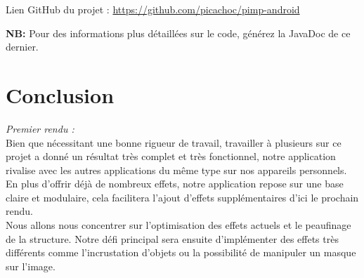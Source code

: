 \documentclass[12pt, a4paper]{article}
\begin{document}
\vspace{1cm}
\faArrowRight Lien GitHub du projet :
\href{https://github.com/picachoc/pimp-android}{https://github.com/picachoc/pimp-android}
\vspace{0.5cm}

\textbf{NB: } Pour des informations plus détaillées sur le code, générez la JavaDoc de ce dernier.

\clearpage


\clearpage


\clearpage


\clearpage


\clearpage


\clearpage


\clearpage 

\section{Conclusion}
\emph{Premier rendu :}
\\
Bien que nécessitant une bonne rigueur de travail, travailler à plusieurs sur ce projet a donné un résultat très complet et très fonctionnel, notre application rivalise avec les autres applications du même type sur nos appareils personnels.
\\
En plus d'offrir déjà de nombreux effets, notre application repose sur une base claire et modulaire, cela facilitera l'ajout d'effets supplémentaires d'ici le prochain rendu. 
\\
Nous allons nous concentrer sur l'optimisation des effets actuels et le peaufinage de la structure. Notre défi principal sera ensuite d'implémenter des effets très différents comme l'incrustation d'objets ou la possibilité de manipuler un masque sur l'image.
\\
\end{document}
